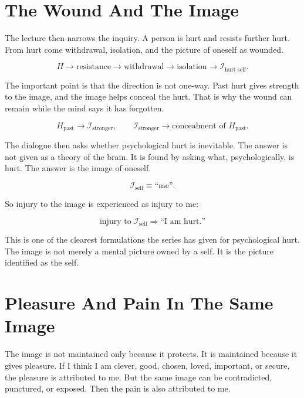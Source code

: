\documentclass[11pt,oneside]{book}
\begin{document}
\section{The Wound And The Image}

The lecture then narrows the inquiry. A person is hurt and resists further hurt. From hurt come withdrawal, isolation, and the picture of oneself as wounded.

\begin{equation}
H \longrightarrow \text{resistance}
\longrightarrow \text{withdrawal}
\longrightarrow \text{isolation}
\longrightarrow \mathcal{I}_{\text{hurt self}}.
\end{equation}

The important point is that the direction is not one-way. Past hurt gives strength to the image, and the image helps conceal the hurt. That is why the wound can remain while the mind says it has forgotten.

\begin{equation}
H_{\text{past}} \longrightarrow \mathcal{I}_{\text{stronger}},
\qquad
\mathcal{I}_{\text{stronger}} \longrightarrow \text{concealment of }H_{\text{past}}.
\end{equation}

The dialogue then asks whether psychological hurt is inevitable. The answer is not given as a theory of the brain. It is found by asking what, psychologically, is hurt. The answer is the image of oneself.

\begin{equation}
\mathcal{I}_{\text{self}} \equiv \text{``me''}.
\end{equation}

So injury to the image is experienced as injury to me:

\begin{equation}
\text{injury to }\mathcal{I}_{\text{self}}
\Longrightarrow
\text{``I am hurt.''}
\end{equation}

This is one of the clearest formulations the series has given for psychological hurt. The image is not merely a mental picture owned by a self. It is the picture identified as the self.

\section{Pleasure And Pain In The Same Image}

The image is not maintained only because it protects. It is maintained because it gives pleasure. If I think I am clever, good, chosen, loved, important, or secure, the pleasure is attributed to me. But the same image can be contradicted, punctured, or exposed. Then the pain is also attributed to me.
\end{document}
